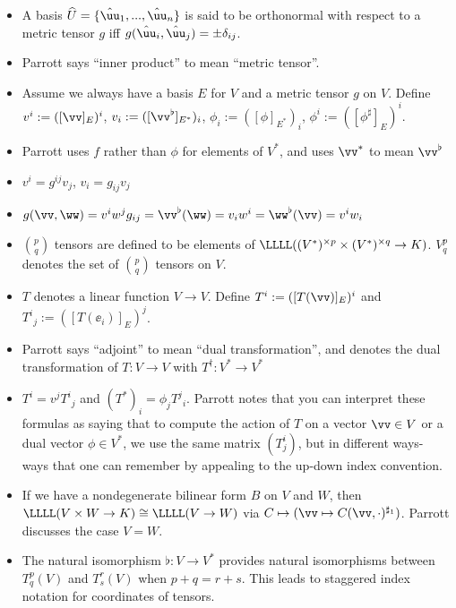 \documentclass{article}
\begin{document}
\begin{itemize}
    \item A basis $\hU = \{\huu_1, ..., \huu_n\}$ is said to be orthonormal with respect to a metric tensor $g$ iff $g(\huu_i, \huu_j) = \pm \delta_{ij}$.
    
    \item Parrott says ``inner product'' to mean ``metric tensor''.

    \item Assume we always have a basis $E$ for $V$ and a metric tensor $g$ on $V$. Define $v^i := ([\vv]_E)^i$, $v_i := ([\vv^\flat]_{E^*})_i$, $\phi_i := ([\phi]_{E^*})_i$, $\phi^i := ([\phi^\sharp]_E)^i$. 
    
    \item Parrott uses $f$ rather than $\phi$ for elements of $V^*$, and uses $\vv^*$ to mean $\vv^\flat$
    
    \item $v^i = g^{ij} v_j$, $v_i = g_{ij} v_j$
    
    \item $g(\vv, \ww) = v^i w^j g_{ij} = \vv^\flat(\ww) = v_i w^i = \ww^\flat(\vv) = v^i w_i$
    
    \item $\binom{p}{q}$ tensors are defined to be elements of $\LLLL((V^*)^{\times p} \times (V^*)^{\times q} \rightarrow K)$. $V^p_q$ denotes the set of $\binom{p}{q}$ tensors on $V$.
    
    \item $T$ denotes a linear function $V \rightarrow V$. Define $T^i := ([T(\vv)]_E)^i$ and $T^i{}_j := ([T(\ee_i)]_E)^j$.
    
    \item Parrott says ``adjoint'' to mean ``dual transformation'', and denotes the dual transformation of $T:V \rightarrow V$ with $T^\dag:V^* \rightarrow V^*$
    
    \item $T^i = v^j T^i{}_j$ and $(T^*)_i = \phi_j T^j{}_i$. Parrott notes that you can interpret these formulas as saying that to compute the action of $T$ on a vector $\vv \in V$ or a dual vector $\phi \in V^*$, we use the same matrix $(T^i_j)$, but in different ways- ways that one can remember by appealing to the up-down index convention.
    
    \item If we have a nondegenerate bilinear form $B$ on $V$ and $W$, then $\LLLL(V \times W \rightarrow K) \cong \LLLL(V \rightarrow W)$ via $C \mapsto (\vv \mapsto C(\vv, \cdot)^{\sharp_1})$. Parrott discusses the case $V = W$.
    
    \item The natural isomorphism $\flat:V \rightarrow V^*$ provides natural isomorphisms between $T^p_q(V)$ and $T^r_s(V)$ when $p + q = r + s$. This leads to staggered index notation for coordinates of tensors.
\end{itemize}
\end{document}

